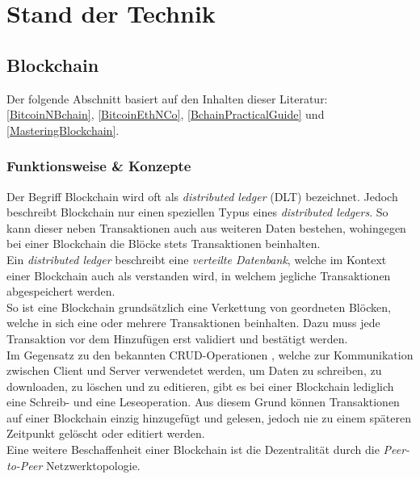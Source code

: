 \chapter{Stand der Technik}
\label{kap:Kapitel02}
%
       
%
\section{Blockchain}
Der folgende Abschnitt basiert auf den Inhalten dieser Literatur: \ref{BitcoinNBchain}, \ref{BitcoinEthNCo}, \ref{BchainPracticalGuide} und \ref{MasteringBlockchain}. 
\subsection{Funktionsweise \& Konzepte }
Der Begriff Blockchain wird oft als \textit{distributed ledger} (DLT) bezeichnet. Jedoch beschreibt Blockchain nur einen speziellen Typus eines \textit{distributed ledgers}. So kann dieser neben Transaktionen auch aus weiteren Daten bestehen, wohingegen bei einer Blockchain die Blöcke stets Transaktionen beinhalten. \\
Ein \textit{distributed ledger} beschreibt eine \textit{verteilte Datenbank}, welche im Kontext einer Blockchain auch als  verstanden wird, in welchem jegliche Transaktionen abgespeichert werden.\\
So ist eine Blockchain grundsätzlich eine Verkettung von geordneten Blöcken, welche in sich eine oder mehrere Transaktionen beinhalten. Dazu muss jede Transaktion vor dem Hinzufügen erst validiert und bestätigt werden.\\
Im Gegensatz zu den bekannten CRUD-Operationen \cite{CRUD:Wiki}, welche zur Kommunikation zwischen Client und Server verwendetet werden, um Daten zu schreiben, zu downloaden, zu löschen und zu editieren, gibt es bei einer Blockchain lediglich eine Schreib- und eine Leseoperation. Aus diesem Grund können Transaktionen auf einer Blockchain einzig hinzugefügt und gelesen, jedoch nie zu einem späteren Zeitpunkt gelöscht oder editiert werden. \\
Eine weitere Beschaffenheit einer Blockchain ist die Dezentralität durch die \textit{Peer-to-Peer} Netzwerktopologie.



